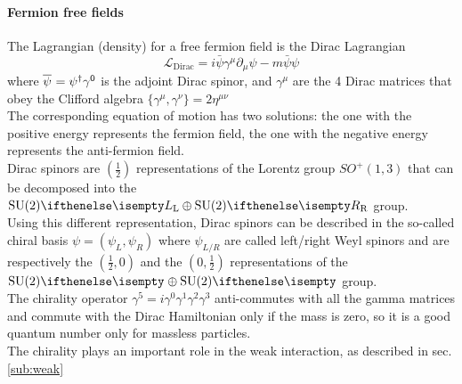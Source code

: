 \paragraph*{Fermion free fields}
The Lagrangian (density) for a free fermion field is the Dirac Lagrangian
\begin{equation}\label{eq:Dirac}
\mathcal{L}_{\text{Dirac}}=i\bar{\psi}\gamma^{\mu}\partial_{\mu}\psi-m\bar{\psi}\psi
\end{equation}
where $\aff{\psi}{}=\ff{\psi}{}^\dagger\gamma^0$ is the adjoint Dirac spinor, and $\gamma^\mu$ are the 4 Dirac matrices that obey the Clifford algebra $\{\gamma^\mu,\gamma^\nu\}=2\eta^{\mu\nu}$\\
The corresponding equation of motion has two solutions: the one with the positive energy represents the fermion field, the one with the negative energy represents the anti-fermion field.\\
Dirac spinors are $\left( \frac{1}{2} \right)$ representations of the Lorentz group $SO^+(1,3)$ that can be decomposed into the $\SU[L]{2} \oplus \SU[R]{2}$ group.\\
Using this different representation, Dirac spinors can be described in the so-called chiral basis $\psi=\left(\psi_L,\psi_R \right)$ where $\psi_{L/R}$ are called left/right Weyl spinors and are respectively the $\left(\frac{1}{2},0\right)$ and the $\left(0,\frac{1}{2}\right)$ representations of the $\SU{2} \oplus \SU{2}$ group.\\
The chirality operator $\gamma^5=i\gamma^0\gamma^1\gamma^2\gamma^3$ anti-commutes with all the gamma matrices and commute with the Dirac Hamiltonian only if the mass is zero, so it is a good quantum number only for massless particles.\\
The chirality plays an important role in the weak interaction, as described in sec. \ref{sub:weak}
